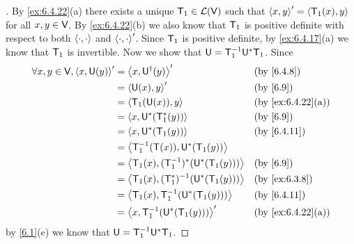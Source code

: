 \begin{proof}[]
  By \cref{ex:6.4.22}(a) there exists a unique \(\mathsf{T}_1 \in \mathcal{L}(\mathsf{V})\) such that \(\left\langle x, y\right\rangle' = \left\langle\mathsf{T}_1(x), y\right\rangle\) for all \(x, y \in \mathsf{V}\).
  By \cref{ex:6.4.22}(b) we also know that \(\mathsf{T}_1\) is positive definite with respect to both \(\left\langle\cdot, \cdot\right\rangle\) and \(\left\langle\cdot, \cdot\right\rangle'\).
  Since \(\mathsf{T}_1\) is positive definite, by \cref{ex:6.4.17}(a) we know that \(\mathsf{T}_1\) is invertible.
  Now we show that \(\mathsf{U} = \mathsf{T}_1^{-1} \mathsf{U}^* \mathsf{T}_1\).
  Since
  \begin{align*}
    \forall x, y \in \V, \inn{x, \U(y)}' & = \inn{x, \U^{\dag}(y)}'                      &  & \text{(by \cref{6.4.8})}        \\
                                         & = \inn{\U(x), y}'                             &  & \text{(by \cref{6.9})}          \\
                                         & = \inn{\T_1(\U(x)), y}                        &  & \text{(by \cref{ex:6.4.22}(a))} \\
                                         & = \inn{x, \U^*(\T_1^*(y))}                    &  & \text{(by \cref{6.9})}          \\
                                         & = \inn{x, \U^*(\T_1(y))}                      &  & \text{(by \cref{6.4.11})}       \\
                                         & = \inn{\T_1^{-1}(\T(x)), \U^*(\T_1(y))}                                            \\
                                         & = \inn{\T_1(x), (\T_1^{-1})^*(\U^*(\T_1(y)))} &  & \text{(by \cref{6.9})}          \\
                                         & = \inn{\T_1(x), (\T_1^*)^{-1}(\U^*(\T_1(y)))} &  & \text{(by \cref{ex:6.3.8})}     \\
                                         & = \inn{\T_1(x), \T_1^{-1}(\U^*(\T_1(y)))}     &  & \text{(by \cref{6.4.11})}       \\
                                         & = \inn{x, \T_1^{-1}(\U^*(\T_1(y)))}'          &  & \text{(by \cref{ex:6.4.22}(a))}
  \end{align*}
  by \cref{6.1}(e) we know that \(\mathsf{U} = \mathsf{T}_1^{-1} \mathsf{U}^* \mathsf{T}_1\).


\end{proof}
